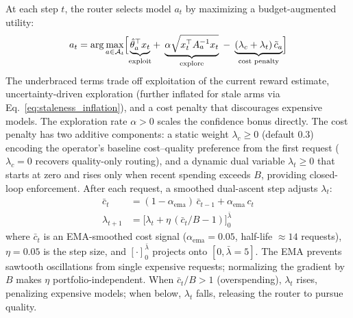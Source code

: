 At each step $t$, the router selects model $a_t$ by maximizing a budget-augmented utility:
\begin{equation}
    a_t = \arg\max_{a \in \mathcal{A}_t} \Bigl[
        \underbrace{\hat\theta_a^\top x_t}_{\text{exploit}}
        +\; \underbrace{\alpha \sqrt{x_t^\top A_a^{-1} x_t}}_{\text{explore}}
        \;-\; \underbrace{(\lambda_c + \lambda_t) \,\tilde{c}_a}_{\text{cost penalty}}
    \Bigr]
    \label{eq:budget_ucb}
\end{equation}
The underbraced terms trade off exploitation of the current reward estimate, uncertainty-driven exploration (further inflated for stale arms via Eq.~\ref{eq:staleness_inflation}), and a cost penalty that discourages expensive models. The exploration rate $\alpha > 0$ scales the confidence bonus directly. The cost penalty has two additive components: a static weight $\lambda_c \geq 0$ (default 0.3) encoding the operator's baseline cost--quality preference from the first request ($\lambda_c = 0$ recovers quality-only routing), and a dynamic dual variable $\lambda_t \geq 0$ that starts at zero and rises only when recent spending exceeds $B$, providing closed-loop enforcement. After each request, a smoothed dual-ascent step adjusts $\lambda_t$:
\begin{align}
    \bar{c}_t &= (1 - \alpha_{\mathrm{ema}})\,\bar{c}_{t-1}
                 + \alpha_{\mathrm{ema}}\,c_t
    \label{eq:cost_ema} \\
    \lambda_{t+1} &= \bigl[\lambda_t + \eta\,(\bar{c}_t / B - 1)\bigr]_{0}^{\bar\lambda}
    \label{eq:dual_update}
\end{align}
where $\bar{c}_t$ is an EMA-smoothed cost signal ($\alpha_{\mathrm{ema}}{=}0.05$, half-life ${\approx}14$ requests), $\eta{=}0.05$ is the step size, and $[\cdot]_0^{\bar\lambda}$ projects onto $[0, \bar\lambda{=}5]$. The EMA prevents sawtooth oscillations from single expensive requests; normalizing the gradient by $B$ makes $\eta$ portfolio-independent. When $\bar{c}_t / B > 1$ (overspending), $\lambda_t$ rises, penalizing expensive models; when below, $\lambda_t$ falls, releasing the router to pursue quality.

